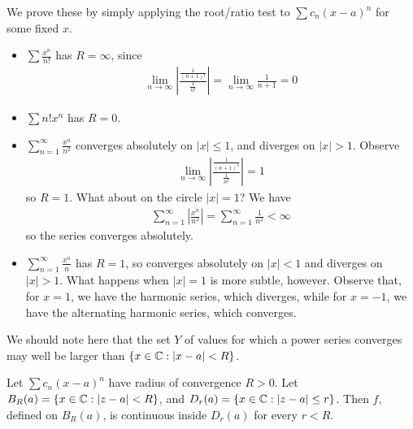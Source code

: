 \documentclass{../../template/note}
\begin{document}
    We prove these by simply applying the root/ratio test to \(\sum c_n (x-a)^n\) for some fixed \(x\).
    
    \begin{example*}
        \begin{itemize}
            \item \(\sum \frac{x^n}{n!}\) has \(R = \infty\), since 
            \begin{align*}
                \lim_{n \to \infty} \left|\frac{\frac 1{(n+1)!}}{\frac 1 {n!}}\right| = \lim_{n \to \infty} \frac 1 {n+1} = 0
            \end{align*}
            \item \(\sum n!x^n\) has \(R = 0\).
            \item \(\sum_{n=1}^\infty \frac{x^n}{n^2}\) converges absolutely on \(|x| \leq 1\), and diverges on \(|x| > 1\). Observe
            \begin{align*}
                \lim_{n \to \infty} \left|\frac{\frac 1 {(n+1)^2}}{\frac 1 {n^2}}\right| = 1
            \end{align*}
            so \(R = 1\). What about on the circle \(|x| = 1\)? We have
            \begin{align*}
                \sum_{n=1}^\infty \left|\frac{x^n}{n^2}\right| = \sum_{n=1}^\infty \frac 1 {n^2} < \infty
            \end{align*}
            so the series converges absolutely.
            \item \(\sum_{n=1}^\infty \frac{x^n}{n}\) has \(R=1\), so converges absolutely on \(|x| < 1\) and diverges on \(|x| > 1\). What happens when \(|x|=1\) is more subtle, however. Observe that, for \(x=1\), we have the harmonic series, which diverges, while for \(x=-1\), we have the alternating harmonic series, which converges.    
        \end{itemize}
    \end{example*}
    
    \begin{remark*}
        We should note here that the set \(Y\) of values for which a power series converges may well be larger than \(\{x \in \mathbb C: |x-a| < R\}\).
    \end{remark*}


    \begin{proposition}
        Let \(\sum c_n(x-a)^n\) have radius of convergence \(R > 0\). Let \(B_R(a) = \{x \in \mathbb C: |z-a| < R\}\), and \(D_r(a) = \{x \in \mathbb C: |z-a| \leq r\}\). Then \(f\), defined on \(B_R(a)\), is continuous inside \(D_r(a)\) for every \(r < R\).       
    \end{proposition}
    
\end{document}
